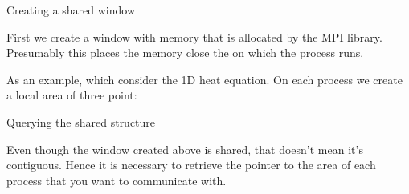  {Creating a shared window}

First we create a window with memory that is allocated by the MPI
library. Presumably this places the memory close the
 on which the process runs.


As an example, which consider the 1D heat equation. On each process we
create a local area of three point:
%

 {Querying the shared structure}

Even though the window created above is shared, that doesn't mean it's
contiguous. Hence it is necessary to retrieve the pointer to the area
of each process that you want to communicate with.


